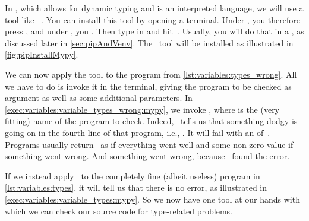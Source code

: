 In \python, which allows for dynamic typing and is an interpreted language, we will use a tool like \mypy~\cite{LLHSVRZSJYYMC2024MOSTFP}.
You can install this tool by opening a terminal.
Under \ubuntu, you therefore press \ubuntuTerminal, and under \microsoftWindows, you \windowsTerminal.
Then type in  and hit~\keys{\enter}.
Usually, you will do that in a , as discussed later in \cref{sec:pipAndVenv}.
The \mypy\ tool will be installed as illustrated in \cref{fig:pipInstallMypy}.%
%
\begin{sloppypar}%
We can now apply the tool to the program  from \cref{lst:variables:types_wrong}.
All we have to do is invoke it in the terminal, giving the program to be checked as argument as well as some additional parameters.
In \cref{exec:variables:variable_types_wrong:mypy}, we invoke , where  is the (very fitting) name of the program to check.
Indeed, \mypy\ tells us that something dodgy is going on in the fourth line of that program, i.e., .
It will fail with an  of~.
Programs usually return~ as  if everything went well and some non-zero value if something went wrong.
And something went wrong, because \mypy\ found the error.%
\end{sloppypar}%
%
%
%
If we instead apply \mypy\ to the completely fine (albeit useless) program  in \cref{lst:variables:types}, it will tell us that there is no error, as illustrated in \cref{exec:variables:variable_types:mypy}.
So we now have one tool at our hands with which we can check our source code for type-related problems.
